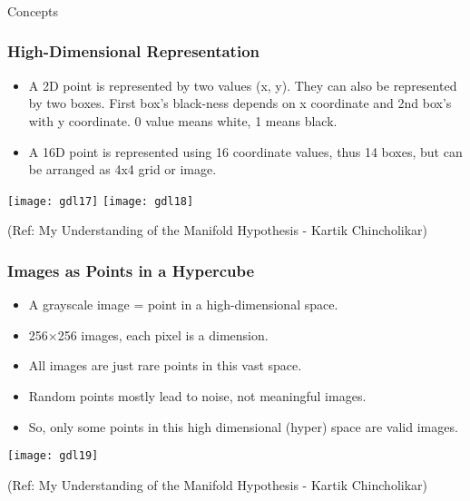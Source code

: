 \begin{frame}[fragile]\frametitle{}
\begin{center}
{\Large Concepts}
\end{center}
\end{frame}

\begin{frame}[fragile]\frametitle{High-Dimensional Representation}
    \begin{itemize}
        \item A 2D point is represented by two values (x, y). They can also be represented by two boxes. First box's black-ness depends on x coordinate and 2nd box's with y coordinate. 0 value means white, 1 means black. 
        \item A 16D point is represented using 16 coordinate values, thus 14 boxes, but can be arranged as 4x4 grid or image.
    \end{itemize}
	
\begin{center}
\texttt{[image: gdl17]}
\texttt{[image: gdl18]}

{\tiny (Ref: My Understanding of the Manifold Hypothesis - Kartik Chincholikar)}	

\end{center}

\end{frame}

\begin{frame}[fragile]\frametitle{Images as Points in a Hypercube}
    \begin{itemize}
        \item A grayscale image = point in a high-dimensional space.
        \item 256×256 images, each pixel is a dimension.
        \item All images are just rare points in this vast space.
        \item Random points mostly lead to noise, not meaningful images.
		\item So, only some points in this high dimensional (hyper) space are valid images.
    \end{itemize}
	
\begin{center}
\texttt{[image: gdl19]}

{\tiny (Ref: My Understanding of the Manifold Hypothesis - Kartik Chincholikar)}	

\end{center}	
\end{frame}

